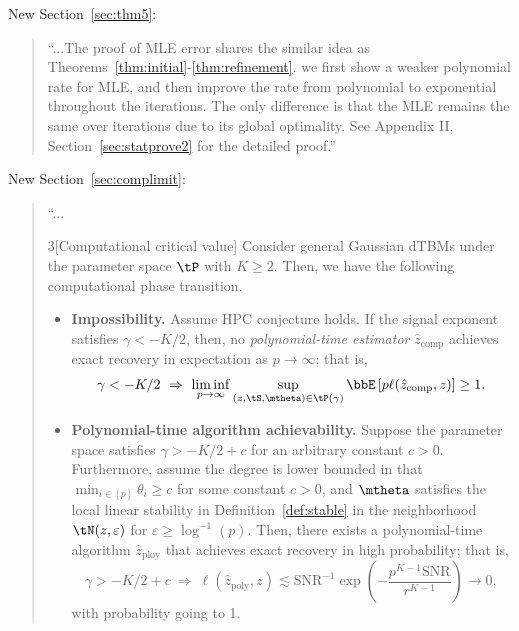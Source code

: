 \documentclass[11pt]{article}
\theoremstyle{definition}
\theoremstyle{definition}
\newcommand{\of}[1]{\left(#1\right)}
\begin{document}
\begin{enumerate}[wide, labelwidth=!, labelindent=0pt]
New Section~\ref{sec:thm5}:
\begin{quote}
``...The proof of MLE error shares the similar idea as Theorems~\ref{thm:initial}-\ref{thm:refinement}. we first show a weaker polynomial rate for MLE, and then improve the rate from polynomial to exponential throughout the iterations. The only difference is that the MLE remains the same over iterations due to its global optimality. See Appendix II, Section~\ref{sec:statprove2} for the detailed proof.''
\end{quote}


New Section~\ref{sec:complimit}:

\begin{quote}
``...
\begin{customthm}{3}[Computational critical value] Consider general Gaussian dTBMs under the parameter space $\tP$ with $K\geq 2$. Then, we have the following computational phase transition.

\begin{itemize}[wide]
    \item \textbf{Impossibility.} Assume HPC conjecture holds. If the signal exponent satisfies $\gamma < -K/2$, then, no \emph{polynomial-time estimator} $\hat z_{\text{comp}}$ achieves exact recovery in expectation as $p\to \infty$; that is, 
\begin{align}
  \gamma<-K/2 \ \Rightarrow \ \liminf_{p\to \infty}\sup_{(z, \tS, \mtheta) \in \tP(\gamma)}  \bbE \left[ p\ell(\hat z_{\text{comp}}, z) \right]\geq 1.
\end{align}
\item \textbf{Polynomial-time algorithm achievability.} Suppose the parameter space satisfies $\gamma  >  -K/2+c$ for an arbitrary constant $c>0$. Furthermore, assume the degree is lower bounded in that $\min_{i\in[p]}\theta_i\geq c$ for some constant $c>0$, and $\mtheta$ satisfies the local linear stability in Definition~\ref{def:stable} in the neighborhood $\tN(z,\varepsilon)$ for $\varepsilon \geq \log^{-1}(p)$. Then, there exists a polynomial-time algorithm $\hat z_{\text{ploy}}$ that achieves exact recovery in high probability; that is,
\begin{equation}
  \gamma>-K/2+c\ \Rightarrow   \  \ell(\hat z_{\text{poly}}, z) \lesssim \text{SNR}^{-1}\exp \of{ - \frac{p^{K-1}\text{SNR}}{r^{K-1}} } \to 0,
\end{equation}
with probability going to 1. 
\end{itemize}
\end{customthm}


\end{quote}
\end{enumerate}
\end{document}

